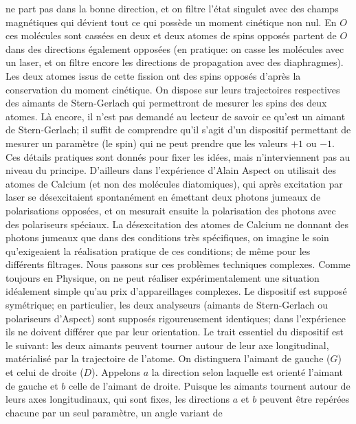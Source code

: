 ne part pas dans la bonne direction, et on filtre l'\'etat singulet avec des
champs magn\'etiques qui d\'evient tout ce qui poss\`ede un moment 
cin\'etique non nul. En $O$ ces mol\'ecules sont cass\'ees en deux et deux
atomes de  spins oppos\'es partent de $O$ dans des directions \'egalement
oppos\'ees (en pratique: on casse les mol\'ecules avec un laser, et on
filtre encore les directions de propagation avec des diaphragmes). Les
deux atomes issus de cette fission ont des spins oppos\'es d'apr\`es la
conservation du moment cin\'etique. On dispose sur leurs trajectoires 
respectives des aimants de Stern-Gerlach qui permettront de mesurer 
les spins des deux atomes. L\`a encore, il n'est pas demand\'e au lecteur 
de savoir ce qu'est un aimant de Stern-Gerlach; il suffit de comprendre 
qu'il s'agit d'un dispositif permettant de mesurer un param\`etre (le spin) 
qui ne peut prendre que les valeurs $+1$ ou $-1$. Ces d\'etails pratiques 
sont donn\'es pour fixer  les id\'ees, mais n'interviennent pas au niveau  
du principe. D'ailleurs dans l'exp\'erience d'Alain Aspect on utilisait des 
atomes de Calcium (et non  des mol\'ecules diatomiques), qui apr\`es
excitation par laser se d\'esexcitaient  spontan\'ement en \'emettant 
deux photons jumeaux de polarisations oppos\'ees, et on mesurait 
ensuite la polarisation des photons avec des polariseurs sp\'eciaux. La
d\'esexcitation des atomes de Calcium ne donnant des photons jumeaux 
que dans des conditions tr\`es sp\'ecifiques, on imagine  le soin
qu'exigeaient la r\'ealisation pratique de ces conditions; de m\^eme  pour
les diff\'erents filtrages. Nous passons  sur  ces probl\`emes techniques
complexes. Comme toujours en Physique, on  ne peut r\'ealiser
exp\'erimentalement une situation id\'ealement simple qu'au prix
d'appareillages complexes.  
\medskip  
Le dispositif est suppos\'e sym\'etrique; en particulier, les deux 
analyseurs (aimants de Stern-Gerlach ou polariseurs d'Aspect) sont 
suppos\'es rigoureusement identiques;
dans l'exp\'erience ils ne doivent diff\'erer que par leur orientation. 
\medskip 
Le trait essentiel du dispositif est le suivant: les deux aimants peuvent 
tourner autour de leur axe longitudinal, mat\'erialis\'e par la trajectoire 
de l'atome. On distinguera l'aimant de gauche ($G$) et celui de droite ($D$). 
Appelons  $a$ la direction selon laquelle est orient\'e l'aimant de gauche 
et $b$ celle de l'aimant de droite. Puisque les aimants tournent autour de 
leurs axes longitudinaux, qui sont fixes, les directions $a$ et $b$ peuvent  
\^etre rep\'er\'ees chacune par un seul param\`etre, un angle variant de  
